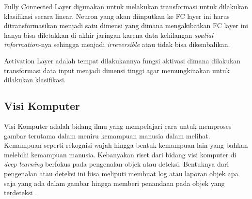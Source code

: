\par Fully Connected Layer digunakan untuk melakukan transformasi untuk dilakukan klasifikasi secara linear.
Neuron yang akan diinputkan ke FC layer ini harus ditransformasikan menjadi satu dimensi yang dimana
mengakibatkan FC layer ini hanya bisa diletakkan di akhir jaringan karena data kehilangan \emph{spatial information}-nya
sehingga menjadi \emph{irreversible} atau tidak bisa dikembalikan.

\par Activation Layer adalah tempat dilakukannya fungsi aktivasi dimana dilakukan transformasi data input
menjadi dimensi tinggi agar memungkinakan untuk dilakukan klasifikasi\cite{putra2016klasifikasi}.







\subsection{Visi Komputer}
\label{subsec:visikomputer}

Visi Komputer adalah bidang ilmu yang mempelajari cara untuk memproses gambar terutama dalam meniru
kemampuan manusia dalam melihat. Kemampuan seperti rekognisi wajah hingga bentuk kemampuan lain yang bahkan
melebihi kemampuan manusia. Kebanyakan riset dari bidang visi komputer di \emph{deep learning} berfokus pada
pengenalan objek atau deteksi. Bentuknya dari pengenalan atau deteksi ini bisa meliputi membuat log atau laporan
objek apa saja yang ada dalam gambar hingga memberi penandaan pada objek yang terdeteksi \cite{Goodfellow-et-al-2016}. 

